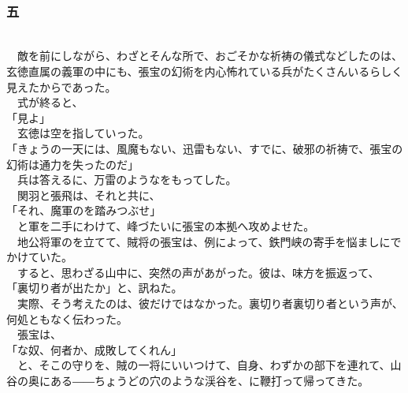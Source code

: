 \documentclass[
  paper=a5,
  fontsize=10pt,
  jafontsize=9.5pt,
  tate,                  %
  open_bracket_pos=nibu, %
]{jlreq}
\begin{document}
\\

\subsubsection{五}

\\


　敵を前にしながら、わざとそんな所で、おごそかな祈祷の儀式などしたのは、玄徳直属の義軍の中にも、張宝の幻術を内心怖れている兵がたくさんいるらしく見えたからであった。\\


　式が終ると、\\


「見よ」\\


　玄徳は空を指していった。\\


「きょうの一天には、風魔もない、迅雷もない、すでに、破邪の祈祷で、張宝の幻術は通力を失ったのだ」\\


　兵は答えるに、万雷のようなをもってした。\\


　関羽と張飛は、それと共に、\\


「それ、魔軍のを踏みつぶせ」\\


　と軍を二手にわけて、峰づたいに張宝の本拠へ攻めよせた。\\


　地公将軍のを立てて、賊将の張宝は、例によって、鉄門峡の寄手を悩ましにでかけていた。\\


　すると、思わざる山中に、突然の声があがった。彼は、味方を振返って、\\


「裏切り者が出たか」と、訊ねた。\\


　実際、そう考えたのは、彼だけではなかった。裏切り者裏切り者という声が、何処ともなく伝わった。\\


　張宝は、\\


「な奴、何者か、成敗してくれん」\\


　と、そこの守りを、賊の一将にいいつけて、自身、わずかの部下を連れて、山谷の奥にある――ちょうどの穴のような渓谷を、に鞭打って帰ってきた。\\
\end{document}
